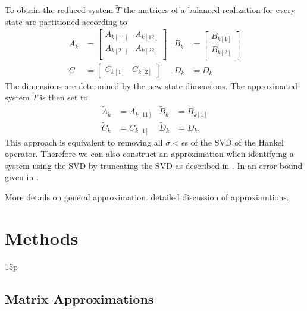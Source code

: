 \documentclass[doctype=mastersthesis,BCOR=15mm,biblatex]{ldvbook}%
\begin{document}
To obtain the reduced system $\tilde{T}$ the matrices of a balanced realization for every state are partitioned according to
\begin{align}
	A_k &=\begin{bmatrix}
	A_{k[11]} & A_{k[12]} \\
	A_{k[21]} & A_{k[22]} \\
	\end{bmatrix}
	&
	B_k &= \begin{bmatrix}
	B_{k[1]} \\ B_{k[2]}
	\end{bmatrix} 
	\\
	C &= \begin{bmatrix}
	C_{k[1]} & C_{k[2]}
	\end{bmatrix}& 
	D_k&=D_k.
\end{align}
The dimensions are determined by the new state dimensions.
The approximated system $\tilde{T}$ is then set to
\begin{align}
	\tilde{A}_k &= A_{k[11]}  & \tilde{B}_k &= B_{k[1]}\\
	\tilde{C}_k &=C_{k[1]}      & \tilde{D}_k &= D_k.
\end{align}
This approach is equivalent to removing all $\sigma<\epsilon$s of the SVD of the Hankel operator.
Therefore we can also construct an approximation when identifying a system using the SVD by truncating the SVD as described in \cite{shokoohi_identification_1987}.
In an error bound given in \cite{sandberg_balanced_2004}.

More details on general approximation.
\cite{antoulas_approximation_2005} detailed discussion of approxiamtions.

\chapter{Methods} 15p

\section{Matrix Approximations}\label{sec:approx}
\end{document}

